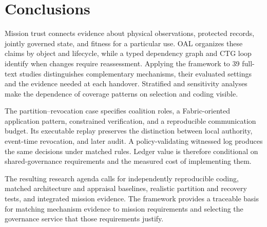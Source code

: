 \section{Conclusions}

Mission trust connects evidence about physical observations, protected records, jointly governed state, and fitness for a particular use. OAL organizes these claims by object and lifecycle, while a typed dependency graph and CTG loop identify when changes require reassessment. Applying the framework to 39 full-text studies distinguishes complementary mechanisms, their evaluated settings and the evidence needed at each handover. Stratified and sensitivity analyses make the dependence of coverage patterns on selection and coding visible.

The partition--revocation case specifies coalition roles, a Fabric-oriented application pattern, constrained verification, and a reproducible communication budget. Its executable replay preserves the distinction between local authority, event-time revocation, and later audit. A policy-validating witnessed log produces the same decisions under matched rules. Ledger value is therefore conditional on shared-governance requirements and the measured cost of implementing them.

The resulting research agenda calls for independently reproducible coding, matched architecture and appraisal baselines, realistic partition and recovery tests, and integrated mission evidence. The framework provides a traceable basis for matching mechanism evidence to mission requirements and selecting the governance service that those requirements justify.
